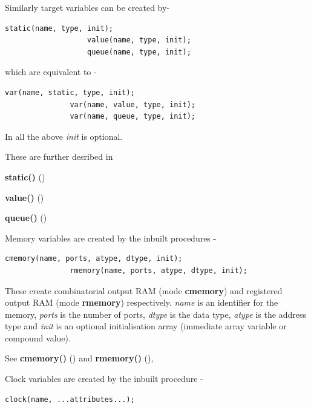             Similarly target variables can be created by-
            \begin{lstlisting}[gobble=12, language=threepl]
                   static(name, type, init);
                   value(name, type, init);
                   queue(name, type, init);
            \end{lstlisting}
            which are equivalent to -
            \begin{lstlisting}[gobble=12, language=threepl]
               var(name, static, type, init);
               var(name, value, type, init);
               var(name, queue, type, init);
            \end{lstlisting}
            In all the above {\em init} is optional.

            These are further desribed in 
            \blist
            \item   {\bf static()} ()
            \item   {\bf value()} ()
            \item   {\bf queue()} ()
            \blend

            Memory variables are created by the inbuilt procedures -
            \begin{lstlisting}[gobble=12, language=threepl]
               cmemory(name, ports, atype, dtype, init);
               rmemory(name, ports, atype, dtype, init);
            \end{lstlisting}
            These create combinatorial output RAM (mode {\bf cmemory}) and
            registered output RAM (mode {\bf rmemory}) respectively. {\em name} is
            an identifier for the memory, {\em ports} is the number of ports, {\em
            dtype} is the data type, {\em atype} is the address type and {\em init}
            is an optional initialisation array (immediate array variable or
            compound value).
            
            See {\bf cmemory()} () and
            {\bf rmemory()} (),
                        
            Clock variables are created by the inbuilt procedure -
             \begin{lstlisting}[gobble=12, language=threepl]
                clock(name, ...attributes...);
            \end{lstlisting}
            
